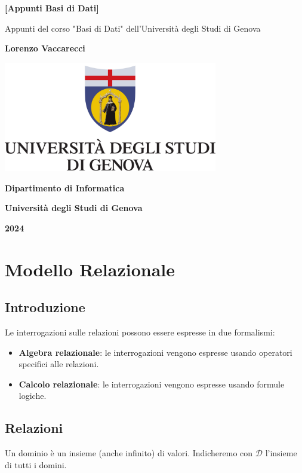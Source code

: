 \documentclass[12pt, a4paper]{report}
\begin{document}
    \begin{titlepage}
        \centering
        {\Huge \bfseries{[Appunti Basi di Dati]}\par}
        \vspace{1cm}
        {\large Appunti del corso "Basi di Dati" dell'Università degli Studi di Genova\par}
        {\Large\bfseries Lorenzo Vaccarecci\par}
        \vspace{1cm}
        \includegraphics[width=0.7\textwidth]{Appunti Latex/Immagini/logoUnige.png}\\
        \vspace{1cm}
        {\Large\bfseries Dipartimento di Informatica\par}
        {\Large\bfseries Università degli Studi di Genova\par}
        {\Large\bfseries 2024\par}
    \end{titlepage}
    \tableofcontents
    \chapter{Modello Relazionale}
        \section{Introduzione}
            Le interrogazioni sulle relazioni possono essere espresse in due formalismi:
            \begin{itemize}
                \item \textbf{Algebra relazionale}: le interrogazioni vengono espresse usando operatori specifici alle relazioni.
                \item \textbf{Calcolo relazionale}: le interrogazioni vengono espresse usando formule logiche.
            \end{itemize}
        \section{Relazioni}
            Un dominio è un insieme (anche infinito) di valori. Indicheremo con $\mathcal{D}$ l'insieme di tutti i domini.
\end{document}

